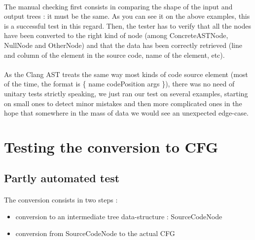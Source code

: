 \documentclass{report}
\begin{document}
\paragraph{}
\hspace{4mm}\textnormal{The manual checking first consists in comparing the shape of the input and output trees : it must be the same. As you can see it on the above examples,
this is a successful test in this regard. Then, the tester has to verify that all the nodes have been converted to the right kind of node (among ConcreteASTNode,
NullNode and OtherNode) and that the data has been correctly retrieved (line and column of the element in the source code, name of the element, etc).}

\paragraph{}
\hspace{4mm}\textnormal{As the Clang AST treats the same way most kinds of code source element (most of the time, the format is \{ name codePosition args \}), there was no need of unitary tests
strictly speaking, we just ran our test on several examples, starting on small ones to detect minor mistakes and then more complicated ones in the hope that somewhere
in the mass of data we would see an unexpected edge-case.}

\section{Testing the conversion to CFG}

\subsection{Partly automated test}

\paragraph{}
\hspace{4mm}\textnormal{The conversion consists in two steps :}

\vspace{3mm}
\begin{itemize}
\item conversion to an intermediate tree data-structure : SourceCodeNode\vspace{1mm}
\item conversion from SourceCodeNode to the actual CFG\vspace{1mm}
\end{itemize}
\end{document}
